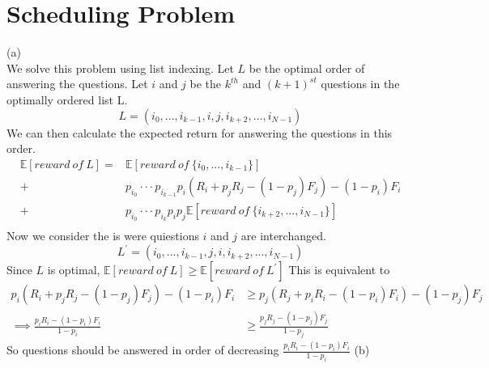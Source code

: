 \documentclass[11pt, oneside]{article}   	%
\begin{document}
\section{Scheduling Problem}
(a) \\
We solve this problem using list indexing. Let $L$ be the optimal order of answering the questions. Let $i$ and $j$ be the $k^{th}$ and $(k + 1)^{st}$ questions in the optimally ordered list L.
$$
L = (i_{0},...,i_{k-1},i,j,i_{k+2},...,i_{N-1})
$$
We can then calculate the expected return for answering the questions in this order.
\begin{align*}
\mathbb{E}[{reward~of~L}] = & \mathbb{E} [reward~of~\{i_{0},...,i_{k-1}\}] \\
+ & p_{i_{0}}···p_{i_{k-1}} p_{i}(R_{i}+p_{j}R_{j} -(1-p_{j})F_{j})-(1-p_{i})F_{i}  \\
+ & p_{i_{0}} ···p_{i_{k}} p_{i}p_{j} \mathbb{E}[reward~of~\{i_{k+2},...,i_{N-1}\}] \\
\end{align*}
Now we consider the is were quiestions $i$ and $j$ are interchanged.
$$
L^{\prime} = (i_{0},...,i_{k-1},j,i,i_{k+2},...,i_{N-1})
$$
Since $L$ is optimal, $\mathbb{E}[{reward~of~L}] \geq \mathbb{E}[{reward~of~L^{\prime}}]$
This is equivalent to 
\begin{align*}
p_{i}(R_{i}+p_{j}R_{j} -(1-p_{j})F_{j})-(1-p_{i})F_{i} &\geq p_{j}(R_{j}+p_{i}R_{i} -(1-p_{i})F_{i})-(1-p_{j})F_{j} \\
\implies \frac{p_{i}R_{i}-(1-p_{i})F_{i}}{1-p_{i}} &\geq \frac{p_{j}R_{j}-(1-p_{j})F_{j}}{1-p_{j}}
\end{align*}
So questions should be answered in order of decreasing $\frac{p_{i}R_{i}-(1-p_{i})F_{i}}{1-p_{i}}$
(b)
\end{document}
